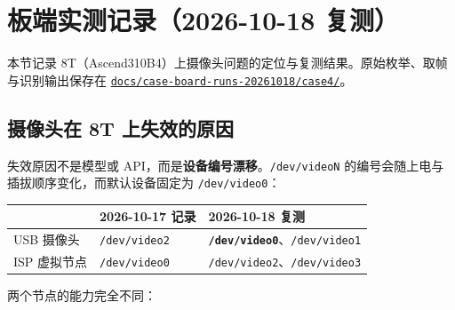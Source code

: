 \section{板端实测记录（2026-10-18
复测）}\label{src-experiment-case4-board-evidence}

本节记录
8T（Ascend310B4）上摄像头问题的定位与复测结果。原始枚举、取帧与识别输出保存在
\href{https://github.com/zhouxzh/Ascend310/blob/main/docs/case-board-runs-20261018/case4/README.md}{\passthrough{\lstinline!docs/case-board-runs-20261018/case4/!}}。

\subsection{摄像头在 8T
上失效的原因}\label{ux6444ux50cfux5934ux5728-8t-ux4e0aux5931ux6548ux7684ux539fux56e0}

失效原因不是模型或
API，而是\textbf{设备编号漂移}。\passthrough{\lstinline!/dev/videoN!}
的编号会随上电与插拔顺序变化，而默认设备固定为
\passthrough{\lstinline!/dev/video0!}：

\begin{longtable}[]{@{}lll@{}}
\toprule\noalign{}
& 2026-10-17 记录 & 2026-10-18 复测 \\
\midrule\noalign{}
\endhead
\bottomrule\noalign{}
\endlastfoot
USB 摄像头 & \passthrough{\lstinline!/dev/video2!} &
\textbf{\passthrough{\lstinline!/dev/video0!}}、\passthrough{\lstinline!/dev/video1!} \\
ISP 虚拟节点 & \passthrough{\lstinline!/dev/video0!} &
\passthrough{\lstinline!/dev/video2!}、\passthrough{\lstinline!/dev/video3!} \\
\end{longtable}

两个节点的能力完全不同：

